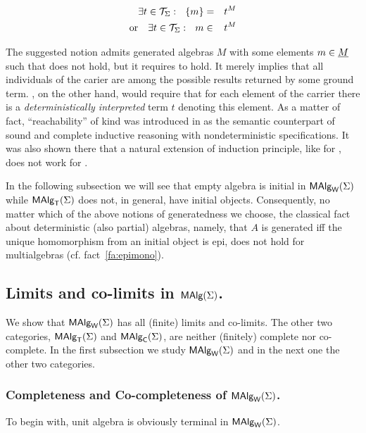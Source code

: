 \documentclass[10pt]{article}
\begin{document}
\begin{eqnarray}
\exists t\in{\cal T}_{\Sigma}:\ \ \{m\} & = & t^M \label{eq:reachA} \\
{\rm or\ \ \ }\exists t\in{\cal T}_{\Sigma}:\ \ m & \in & t^M \label{eq:reachB}
\end{eqnarray}

The suggested notion  admits generated algebras $M$ with
some elements $m\in\underline {M}$ such that  does not hold,
but it requires  to hold. It merely implies that all
individuals of the carier are among the possible results returned by
some ground term.  , on the other hand, would require
that for each element of the carrier there is a {\em deterministically
interpreted} term $t$ denoting this element.  As a matter of fact,
``reachability'' of kind  was introduced in \cite{c:133}
as the semantic counterpart of sound and complete inductive reasoning
with nondeterministic specifications. It was also shown there that a
natural extension of induction principle, like for ,
does not work for .

In the following subsection we will see that empty algebra is initial
in $\mbox{\rm\sf MAlg}_{\sf W}(\Sigma)$ while $\mbox{\rm\sf MAlg}_{\sf T}(\Sigma)$ does not, in general, have initial
objects. Consequently, no matter which of the above notions of
generatedness we choose, the classical fact about deterministic (also
partial) algebras, namely, that $A$ is generated iff the unique
homomorphism from an initial object is epi, does not hold for
multialgebras (cf. fact~\ref{fa:epimono}).


\subsection{Limits and co-limits in $\mbox{\rm\sf MAlg}(\Sigma)$.}
\label{sub:limit}

We show that $\mbox{\rm\sf MAlg}_{\sf W}(\Sigma)$ has all (finite) limits and co-limits. The other
two categories, $\mbox{\rm\sf MAlg}_{\sf T}(\Sigma)$ and $\mbox{\rm\sf MAlg}_{\sf C}(\Sigma)$, are neither (finitely) complete
nor co-complete.  In the first subsection we study $\mbox{\rm\sf MAlg}_{\sf W}(\Sigma)$ and in the
next one the other two categories.

\subsubsection{Completeness and Co-completeness of $\mbox{\rm\sf MAlg}_{\sf W}(\Sigma)$.}

To begin with, unit algebra is obviously terminal in $\mbox{\rm\sf MAlg}_{\sf W}(\Sigma)$.
\end{document}
